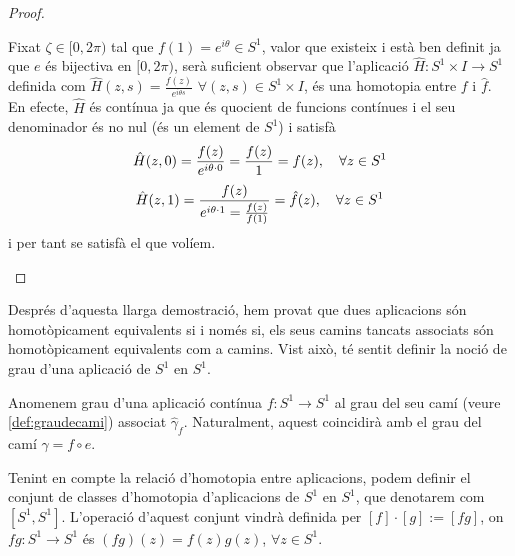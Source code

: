 \documentclass[../main.tex]{subfiles}
\begin{document}
\begin{proof}
\begin{enumerate}[($\Leftarrow$)]
    Fixat $\zeta\in [0,2\pi)$ tal que $f(1) = e^{i\theta}\in S^1$, valor que existeix i està ben definit ja que $e$ és bijectiva en $[0,2\pi)$, serà suficient observar que l'aplicació $\hat{H}:S^1\times I\rightarrow S^1$ definida com $\hat{H}(z,s) =\frac{f(z)}{e^{i\theta s}}$ $\forall (z,s)\in S^1\times I$, és una homotopia entre $f$ i $\hat{f}$. En efecte, $\hat{H}$ és contínua ja que és quocient de funcions contínues i el seu denominador és no nul (és un element de $S^1$) i satisfà
    \begin{equation}
        \notag
        \hat{H}(z,0) = \frac{f(z)}{e^{i\theta\cdotp 0}} = \frac{f(z)}{1} = f(z),\quad \forall z\in S^1
    \end{equation}
    \begin{equation}
        \notag
        \hat{H}(z,1) = \frac{f(z)}{e^{i\theta\cdotp 1} = \frac{f(z)}{f(1)}} = \hat{f}(z),\quad\forall z\in S^1
    \end{equation}
    i per tant se satisfà el que volíem.
\end{enumerate}
\end{proof}

Després d'aquesta llarga demostració, hem provat que dues aplicacions són homotòpicament equivalents si i només si, els seus camins tancats associats són homotòpicament equivalents com a camins. Vist això, té sentit definir la noció de grau d'una aplicació de $S^1$ en $S^1$.

\begin{defi}
\label{def:grauaplicacio} Anomenem grau d'una aplicació contínua $f:S^1\rightarrow S^1$ al grau del seu camí (veure \ref{def:graudecami}) associat $\hat{\gamma}_f$. Naturalment, aquest coincidirà amb el grau del camí $\gamma = f\circ e$.
\end{defi}



\begin{defi}
\label{def:classesdhomotopiadaplicacions} Tenint en compte la relació d'homotopia entre aplicacions, podem definir el conjunt de classes d'homotopia d'aplicacions de $S^1$ en $S^1$, que denotarem com $[S^1,S^1]$. L'operació d'aquest conjunt vindrà definida per $[f]\cdotp[g]:=[fg]$, on $fg:S^1\rightarrow S^1$ és $(fg)(z) = f(z)g(z)$, $\forall z\in S^1$.
\end{defi}
\end{document}
